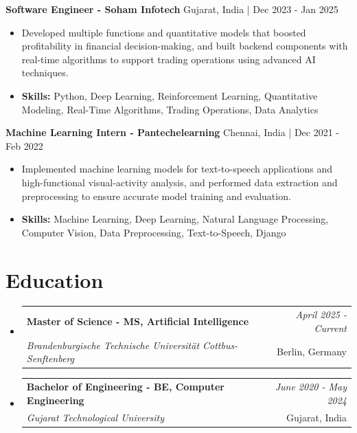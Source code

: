\documentclass[a4paper,11pt]{article}
\makeatletter
\newcommand{\resumeSubheading}[4]{
\vspace{0.5mm}\item
    \begin{tabular*}{\linewidth}[t]{l@{\extracolsep{\fill}}r}
        \textbf{#1} & \textit{\footnotesize{#4}} \\
        \textit{\footnotesize{#3}} &  \footnotesize{#2}\\
    \end{tabular*}
    \vspace{-2.4mm}
}
\makeatother
\begin{document}
\vspace{1mm}
  \textbf{Software Engineer - Soham Infotech} \hfill Gujarat, India | Dec 2023 - Jan 2025
\vspace{-1.5mm} %
\begin{itemize}
  \item Developed multiple functions and quantitative models that boosted profitability in financial decision-making, and built backend components with real-time algorithms to support trading operations using advanced AI techniques.

\vspace{-2mm}
  \item \textbf{Skills:} Python, Deep Learning, Reinforcement Learning, Quantitative Modeling, Real-Time Algorithms, Trading Operations, Data Analytics
\end{itemize}

\vspace{1mm}
  \textbf{Machine Learning Intern - Pantechelearning} \hfill Chennai, India | Dec 2021 - Feb 2022
\vspace{-1.5mm} %
\begin{itemize}
  \item Implemented machine learning models for text-to-speech applications and high-functional visual-activity analysis, and performed data extraction and preprocessing to ensure accurate model training and evaluation.
\vspace{-2mm}
  \item \textbf{Skills:} Machine Learning, Deep Learning, Natural Language Processing, Computer Vision, Data Preprocessing, Text-to-Speech, Django
\end{itemize}\section{\textbf{Education}}
\vspace{-0.4mm}

\begin{itemize}[leftmargin=0.15in, label={}]
\resumeSubheading
{Master of Science - MS, Artificial Intelligence }{Berlin, Germany}
{Brandenburgische Technische Universität Cottbus-Senftenberg  }{April 2025 - Current}

\vspace{1.0mm} %
\resumeSubheading
{Bachelor of Engineering - BE, Computer Engineering  }{Gujarat, India}
{Gujarat Technological University }{June 2020 - May 2024}

\end{itemize}
\end{document}
